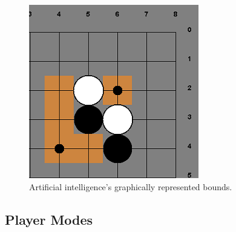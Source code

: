 \documentclass{l3proj}
\begin{document}
\begin{figure}[H]
\centering
\includegraphics[scale=1]{Images/GUI-5-Bounds.png}
\caption{Artificial intelligence's graphically represented bounds.}
\end{figure}

\subsection{Player Modes}
\end{document}
